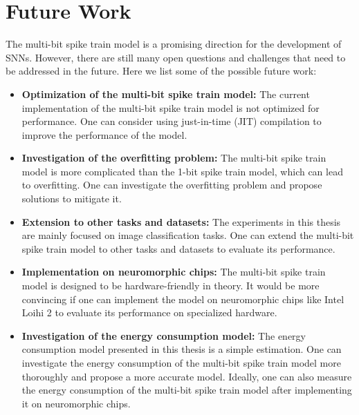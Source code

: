     \section{Future Work}
    \label{sec:future_work}
        The multi-bit spike train model is a promising direction for the development of SNNs. However, there are still many open questions and challenges that need to be addressed in the future. Here we list some of the possible future work:
        \begin{itemize}
            \item \textbf{Optimization of the multi-bit spike train model:} The current implementation of the multi-bit spike train model is not optimized for performance. One can consider using just-in-time (JIT) compilation to improve the performance of the model. 
            \item \textbf{Investigation of the overfitting problem:} The multi-bit spike train model is more complicated than the 1-bit spike train model, which can lead to overfitting. One can investigate the overfitting problem and propose solutions to mitigate it.
            \item \textbf{Extension to other tasks and datasets:} The experiments in this thesis are mainly focused on image classification tasks. One can extend the multi-bit spike train model to other tasks and datasets to evaluate its performance.
            \item \textbf{Implementation on neuromorphic chips:} The multi-bit spike train model is designed to be hardware-friendly in theory. It would be more convincing if one can implement the model on neuromorphic chips like Intel Loihi 2 to evaluate its performance on specialized hardware.
            \item \textbf{Investigation of the energy consumption model:} The energy consumption model presented in this thesis is a simple estimation. One can investigate the energy consumption of the multi-bit spike train model more thoroughly and propose a more accurate model. Ideally, one can also measure the energy consumption of the multi-bit spike train model after implementing it on neuromorphic chips.
        \end{itemize}
